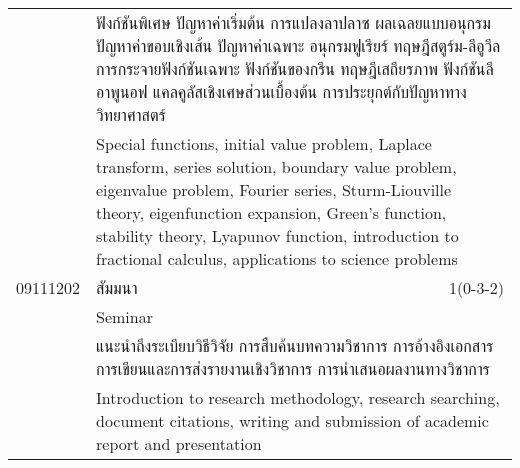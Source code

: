 \begin{longtable}{p{}p{}r{}}
&  \multicolumn{2}{p{0.75\textwidth}}{ฟังก์ชันพิเศษ ปัญหาค่าเริ่มต้น การแปลงลาปลาซ ผลเฉลยแบบอนุกรม ปัญหาค่าขอบเชิงเส้น ปัญหาค่าเฉพาะ อนุกรมฟูเรียร์ ทฤษฎีสตูร์ม-ลีอูวีล การกระจายฟังก์ชันเฉพาะ ฟังก์ชันของกรีน ทฤษฎีเสถียรภาพ ฟังก์ชันลีอาพูนอฟ แคลคูลัสเชิงเศษส่วนเบื้องต้น การประยุกต์กับปัญหาทางวิทยาศาสตร์} \\
&  \multicolumn{2}{p{0.75\textwidth}}{Special functions, initial value problem, Laplace transform, series solution, boundary value problem, eigenvalue problem, Fourier series, Sturm-Liouville theory, eigenfunction expansion, Green’s function, stability theory, Lyapunov function, introduction to fractional calculus, applications to science problems} \\[6mm]
09111202 & สัมมนา & 1(0-3-2)\\
 & Seminar & \\[1mm]
&  \multicolumn{2}{p{0.75\textwidth}}{แนะนำถึงระเบียบวิธีวิจัย การสืบค้นบทความวิชาการ การอ้างอิงเอกสาร การเขียนและการส่งรายงานเชิงวิชาการ การนำเสนอผลงานทางวิชาการ} \\
&  \multicolumn{2}{p{0.75\textwidth}}{Introduction to research methodology, research searching, document citations, writing and submission of academic report and presentation} \\[6mm]
\end{longtable}
